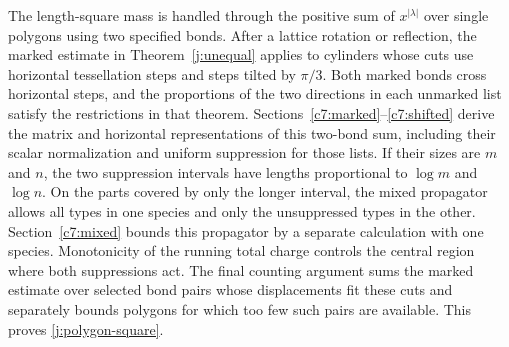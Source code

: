 The length-square mass is handled through the positive sum of
$x^{|\lambda|}$ over single polygons using two specified bonds. After
a lattice rotation or reflection, the marked estimate in
Theorem~\ref{j:unequal} applies to cylinders whose cuts use horizontal
tessellation steps and steps tilted by $\pi/3$. Both marked bonds cross
horizontal steps, and the proportions of the two directions in each
unmarked list satisfy the restrictions in that theorem.
Sections~\ref{c7:marked}--\ref{c7:shifted} derive the matrix and
horizontal representations of this two-bond sum, including their
scalar normalization and uniform suppression for those lists. If
their sizes are $m$ and $n$, the two suppression
intervals have lengths proportional to $\log m$ and $\log n$. On the
parts covered by only the longer interval, the mixed propagator allows
all types in one species and only the unsuppressed types in the other.
Section~\ref{c7:mixed} bounds this propagator by a separate calculation
with one species. Monotonicity of the running total charge
controls the central region where both suppressions act. The final
counting argument sums the marked estimate over selected bond pairs whose
displacements fit these cuts and
separately bounds polygons for which too few such pairs are available.
This proves
\eqref{j:polygon-square}.
